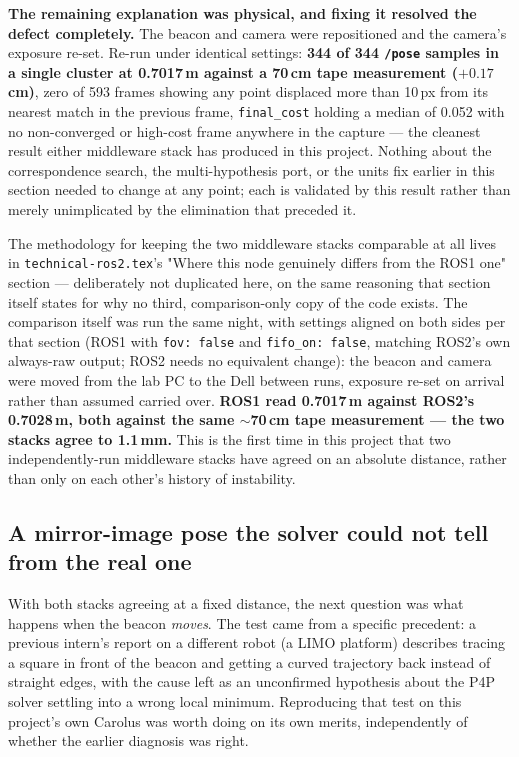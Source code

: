 \documentclass[11pt]{article}
\begin{document}
\textbf{The remaining explanation was physical, and fixing it resolved the
defect completely.} The beacon and camera were repositioned and the
camera's exposure re-set. Re-run under identical settings: \textbf{344 of
344 \texttt{/pose} samples in a single cluster at 0.7017\,m against a
70\,cm tape measurement ($+0.17$\,cm)}, zero of 593 frames showing any
point displaced more than 10\,px from its nearest match in the previous
frame, \texttt{final\_cost} holding a median of 0.052 with no non-converged
or high-cost frame anywhere in the capture --- the cleanest result either
middleware stack has produced in this project. Nothing about the
correspondence search, the multi-hypothesis port, or the units fix earlier
in this section needed to change at any point; each is validated by this
result rather than merely unimplicated by the elimination that preceded it.

The methodology for keeping the two middleware stacks comparable at all
lives in \texttt{technical-ros2.tex}'s "Where this node genuinely differs
from the ROS1 one" section --- deliberately not duplicated here, on the
same reasoning that section itself states for why no third,
comparison-only copy of the code exists. The comparison itself was run the
same night, with settings aligned on both sides per that section (ROS1 with
\texttt{fov: false} and \texttt{fifo\_on: false}, matching ROS2's own
always-raw output; ROS2 needs no equivalent change): the beacon and camera
were moved from the lab PC to the Dell between runs, exposure re-set on
arrival rather than assumed carried over. \textbf{ROS1 read 0.7017\,m
against ROS2's 0.7028\,m, both against the same $\sim$70\,cm tape
measurement --- the two stacks agree to 1.1\,mm.} This is the first time
in this project that two independently-run middleware stacks have agreed
on an absolute distance, rather than only on each other's history of
instability.

\subsection{A mirror-image pose the solver could not tell from the real
one}

With both stacks agreeing at a fixed distance, the next question was what
happens when the beacon \emph{moves}. The test came from a specific
precedent: a previous intern's report on a different robot (a LIMO
platform) describes tracing a square in front of the beacon and getting a
curved trajectory back instead of straight edges, with the cause left as
an unconfirmed hypothesis about the P4P solver settling into a wrong local
minimum. Reproducing that test on this project's own Carolus was worth
doing on its own merits, independently of whether the earlier diagnosis
was right.
\end{document}
